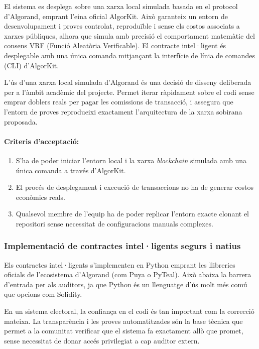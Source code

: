El sistema es desplega sobre una xarxa local simulada basada en el protocol d'Algorand, emprant l'eina oficial AlgorKit.
Això garanteix un entorn de desenvolupament i proves controlat, reproduïble i sense els costos associats a xarxes públiques, alhora que simula amb precisió el comportament matemàtic del consens VRF (Funció Aleatòria Verificable).
El contracte intel·ligent és desplegable amb una única comanda mitjançant la interfície de línia de comandes (CLI) d'AlgorKit.

L'ús d'una xarxa local simulada d'Algorand és una decisió de disseny deliberada per a l'àmbit acadèmic del projecte. 
Permet iterar ràpidament sobre el codi sense emprar doblers reals per pagar les comissions de transacció, i assegura que l'entorn de proves reprodueixi exactament l'arquitectura de la xarxa sobirana proposada.

\paragraph{Criteris d'acceptació:}
\begin{enumerate}[label=\roman*.]
    \item S'ha de poder iniciar l'entorn local i la xarxa \textit{blockchain} simulada amb una única comanda a través d'AlgorKit.
    \item El procés de desplegament i execució de transaccions no ha de generar costos econòmics reals.
    \item Qualsevol membre de l'equip ha de poder replicar l'entorn exacte clonant el repositori sense necessitat de configuracions manuals complexes.
\end{enumerate}

\subsubsection{Implementació de contractes intel·ligents segurs i natius}

Els contractes intel·ligents s'implementen en Python emprant les llibreries oficials de l'ecosistema d'Algorand (com Puya o PyTeal).
Això abaixa la barrera d'entrada per als auditors, ja que Python és un llenguatge d'ús molt més comú que opcions com Solidity.

En un sistema electoral, la confiança en el codi és tan important com la correcció mateixa. 
La transparència i les proves automatitzades són la base tècnica que permet a la comunitat verificar que el sistema fa exactament allò que promet, sense necessitat de donar accés privilegiat a cap auditor extern.


